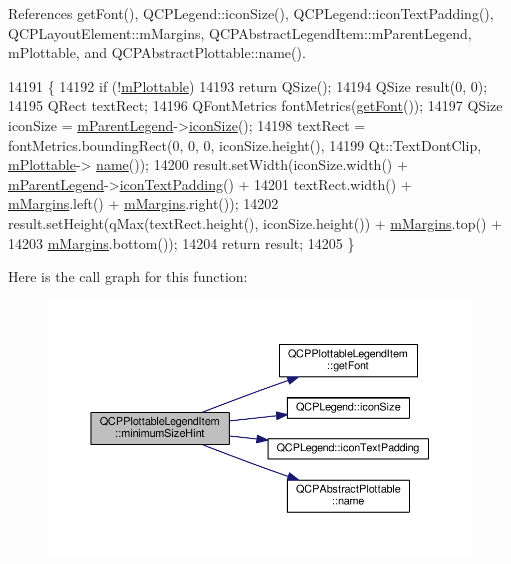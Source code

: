 References get\+Font(), Q\+C\+P\+Legend\+::icon\+Size(), Q\+C\+P\+Legend\+::icon\+Text\+Padding(), Q\+C\+P\+Layout\+Element\+::m\+Margins, Q\+C\+P\+Abstract\+Legend\+Item\+::m\+Parent\+Legend, m\+Plottable, and Q\+C\+P\+Abstract\+Plottable\+::name().


\begin{DoxyCode}
14191                                                     \{
14192   \textcolor{keywordflow}{if} (!\hyperlink{class_q_c_p_plottable_legend_item_ada647fb4b22971a1a424e15b4f6af0d9}{mPlottable})
14193     \textcolor{keywordflow}{return} QSize();
14194   QSize result(0, 0);
14195   QRect textRect;
14196   QFontMetrics fontMetrics(\hyperlink{class_q_c_p_plottable_legend_item_a8a85c8a25affb4895423d730164d61de}{getFont}());
14197   QSize iconSize = \hyperlink{class_q_c_p_abstract_legend_item_aafcd9fc6fcb10f4a8d46037011afafe8}{mParentLegend}->\hyperlink{class_q_c_p_legend_a27dfb770b14adc0e8811bef8129780a5}{iconSize}();
14198   textRect = fontMetrics.boundingRect(0, 0, 0, iconSize.height(),
14199                                       Qt::TextDontClip, \hyperlink{class_q_c_p_plottable_legend_item_ada647fb4b22971a1a424e15b4f6af0d9}{mPlottable}->
      \hyperlink{class_q_c_p_abstract_plottable_a1affc1972938e4364a9325e4e4e4dcea}{name}());
14200   result.setWidth(iconSize.width() + \hyperlink{class_q_c_p_abstract_legend_item_aafcd9fc6fcb10f4a8d46037011afafe8}{mParentLegend}->\hyperlink{class_q_c_p_legend_a9d6d07042a284c4ba5f9e3cb5c9281ef}{iconTextPadding}() +
14201                   textRect.width() + \hyperlink{class_q_c_p_layout_element_ac2a32b99ee527ca5dfff9da03628fe94}{mMargins}.left() + \hyperlink{class_q_c_p_layout_element_ac2a32b99ee527ca5dfff9da03628fe94}{mMargins}.right());
14202   result.setHeight(qMax(textRect.height(), iconSize.height()) + \hyperlink{class_q_c_p_layout_element_ac2a32b99ee527ca5dfff9da03628fe94}{mMargins}.top() +
14203                    \hyperlink{class_q_c_p_layout_element_ac2a32b99ee527ca5dfff9da03628fe94}{mMargins}.bottom());
14204   \textcolor{keywordflow}{return} result;
14205 \}
\end{DoxyCode}


Here is the call graph for this function\+:\nopagebreak
\begin{figure}[H]
\begin{center}
\leavevmode
\includegraphics[width=350pt]{class_q_c_p_plottable_legend_item_a76bad654ebc8e870392f488419a6a483_cgraph}
\end{center}
\end{figure}


